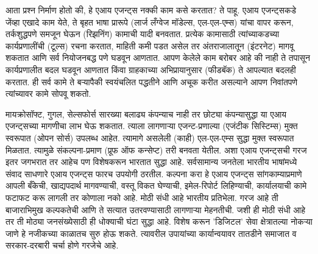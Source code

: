 आता प्रश्न निर्माण होतो की, हे एआय एजन्ट्स नक्की काम कसे करतात? ते पाहू. एआय एजन्ट्सकडे जेंव्हा एखादे काम येते, ते बृहत भाषा प्रारूपे (लार्ज लँग्वेज मॉडेल्स, एल-एल-एम्स) यांचा वापर करून, तर्कशुद्धपणे समजून घेऊन (रिझनिंग) कामाची यादी बनवतात. प्रत्येक कामासाठी त्यांच्याकडच्या कार्यप्रणालींची (टूल्स) रचना करतात, माहिती कमी पडत असेल तर अंतराजालातून (इंटरनेट) मागवू शकतात आणि सर्व नियोजनबद्ध पणे घडवून आणतात. आपण केलेले काम बरोबर आहे की नाही ते तपासून कार्यप्रणालीत बदल घडवून आणतात किंवा ग्राहकाच्या अभिप्रायानुसार (फीडबॅक) ते आपल्यात बदलही करतात. ही सर्व कामे ते बऱ्यापैकी स्वयंचलित पद्धतीने आणि अचूक करीत असल्याने आपण निवांतपणे त्यांच्यावर कामे सोपवू शकतो. 

मायक्रोसॉफ्ट, गुगल, सेल्सफोर्स सारख्या बलाढ्य कंपन्याच नाही तर छोट्या कंपन्यासुद्धा या एआय एजन्ट्सच्या मागणीचा लाभ घेऊ शकतात. त्याला लागणाऱ्या एजन्ट-प्रणाल्या (एजंटीक सिस्टिम्स) मुक्त स्वरूपात (ओपन सोर्स) उपलब्ध आहेत. त्यामागे असलेली (काही)  एल-एल-एम्स सुद्धा मुक्त स्वरूपात मिळतात. त्यामुळे संकल्पना-प्रमाण (प्रूफ ऑफ कन्सेप्ट) तरी बनवता येतील. अशा एआय एजन्ट्सची गरज इतर जगभरात तर आहेच पण विशेषकरून भारतात सुद्धा आहे. सर्वसामान्य जनतेला भारतीय भाषांमध्ये संवाद साधणारे एआय एजन्ट्स  फारच उपयोगी ठरतील. कल्पना करा हे एआय एजन्ट्स सांगकाम्याप्रमाणे आपली बँकेची, खाद्यपदार्थ मागवण्याची, वस्तू विकत घेण्याची, इमेल-रिपोर्ट लिहिण्याची, कार्यालयाची कामे फटाफट करू लागली तर कोणाला नको आहे. मोठी संधी आहे भारतीय प्रतिभेला. गरज आहे ती बाजाराभिमुख कल्पकतेची आणि ते सत्यात उतरवण्यासाठी लागणाऱ्या मेहनतीची. जशी ही मोठी संधी आहे तर ती मोठ्या जनसंख्येसाठी ही धोक्याची घंटा सुद्धा आहे. विशेष करून 'डिजिटल' सेवा क्षेत्रातल्या नोकऱ्या जाणे हे नजीकच्या काळातच सुरु होऊ शकते.  त्यावरील उपायांच्या कार्यान्वयावर तातडीने समाजात व सरकार-दरबारी चर्चा होणे गरजेचे आहे. 